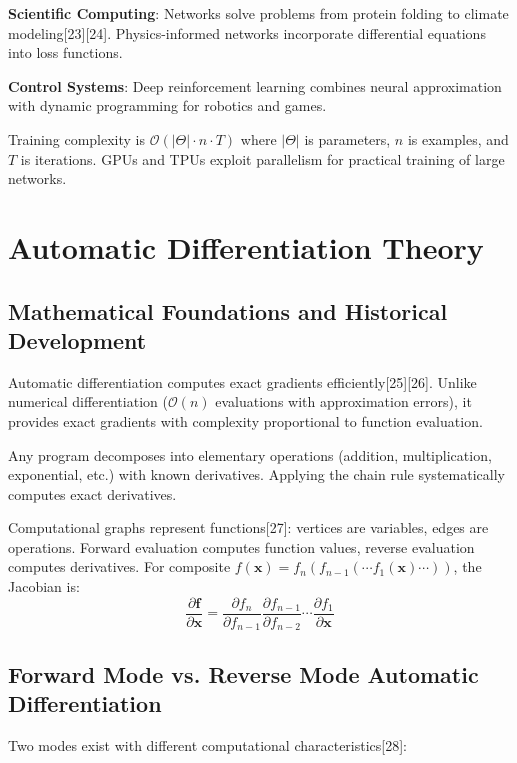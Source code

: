 \documentclass[11pt,a4paper]{report}
\begin{document}
\textbf{Scientific Computing}: Networks solve problems from protein folding to climate modeling[23][24]. Physics-informed networks incorporate differential equations into loss functions.

\textbf{Control Systems}: Deep reinforcement learning combines neural approximation with dynamic programming for robotics and games.

Training complexity is $\mathcal{O}(|\Theta| \cdot n \cdot T)$ where $|\Theta|$ is parameters, $n$ is examples, and $T$ is iterations. GPUs and TPUs exploit parallelism for practical training of large networks.

\section{Automatic Differentiation Theory}

\subsection{Mathematical Foundations and Historical Development}

Automatic differentiation computes exact gradients efficiently[25][26]. Unlike numerical differentiation ($\mathcal{O}(n)$ evaluations with approximation errors), it provides exact gradients with complexity proportional to function evaluation.

Any program decomposes into elementary operations (addition, multiplication, exponential, etc.) with known derivatives. Applying the chain rule systematically computes exact derivatives.

Computational graphs represent functions[27]: vertices are variables, edges are operations. Forward evaluation computes function values, reverse evaluation computes derivatives. For composite $f(\mathbf{x}) = f_n(f_{n-1}(\cdots f_1(\mathbf{x}) \cdots))$, the Jacobian is:
\begin{equation}
\frac{\partial \mathbf{f}}{\partial \mathbf{x}} = \frac{\partial f_n}{\partial f_{n-1}} \frac{\partial f_{n-1}}{\partial f_{n-2}} \cdots \frac{\partial f_1}{\partial \mathbf{x}}
\end{equation}

\subsection{Forward Mode vs. Reverse Mode Automatic Differentiation}

Two modes exist with different computational characteristics[28]:
\end{document}

